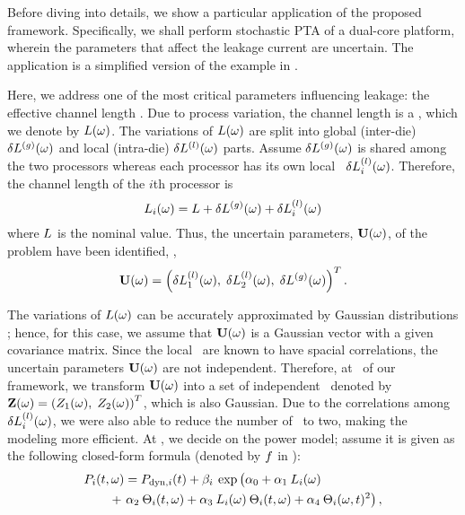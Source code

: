 Before diving into details, we show a particular application of the proposed framework. Specifically, we shall perform stochastic PTA of a dual-core platform, wherein the parameters that affect the leakage current are uncertain. The application is a simplified version of the example in .

Here, we address one of the most critical parameters influencing leakage: the effective channel length \cite{chandra2010, juan2011, juan2012, srivastava2010, shen2009}. Due to process variation, the channel length is a \rv, which we denote by $L(\omega)$. The variations of $L(\omega)$ are split into global (inter-die) ${\delta L^{(g)}}(\omega)$ and local (intra-die) $\delta L^{(l)}(\omega)$ parts. Assume ${\delta L^{(g)}}(\omega)$ is shared among the two processors whereas each processor has its own local \rv\ $\delta L^{(l)}_i(\omega)$. Therefore, the channel length of the $i$th processor is
\begin{equation} \elabel{leakage-partition}
  \Leff_i(\o) = \nLeff + \gLeff(\o) + \lLeff_i(\o)
\end{equation}
where $L$ is the nominal value. Thus, the uncertain parameters, $\mathbf{U}(\omega)$, of the problem have been identified, \ie,
\[
  \mathbf{U}(\omega) = \left(\delta L^{(l)}_1(\omega), \; \delta L^{(l)}_2(\omega), \; {\delta L^{(g)}}(\omega) \right)^T.
\]


The variations of $L(\omega)$ can be accurately approximated by Gaussian distributions \cite{juan2011, juan2012, srivastava2010}; hence, for this case, we assume that $\mathbf{U}(\omega)$ is a Gaussian vector with a given covariance matrix. Since the local \rvs\ are known to have spacial correlations, the uncertain parameters $\mathbf{U}(\omega)$ are not independent. Therefore, at \ of our framework, we transform $\mathbf{U}(\omega)$ into a set of independent \rvs\ denoted by $\mathbf{Z}(\omega) = \left(Z_1(\omega), \; Z_2(\omega)\right)^T$, which is also Gaussian. Due to the correlations among $\delta L^{(l)}_i(\omega)$, we were also able to reduce the number of \rvs\ to two, making the modeling more efficient. At , we decide on the power model; assume it is given as the following closed-form formula (denoted by $f$ in ):
\begin{align*}
  & \P_i(\t, \o) = \P_{\dyn, i}(\t) + \beta_i \: \exp \left(\vphantom{\T^2_i} \alpha_0 + \alpha_1 \: \Leff_i(\o) \right. \\
  & \qquad {} + \left. \alpha_2 \: \T_i(\t, \o) + \alpha_3 \: \Leff_i(\o) \: \T_i(\t, \o) + \alpha_4 \: \T_i(\o, \t)^2 \right),
\end{align*}
